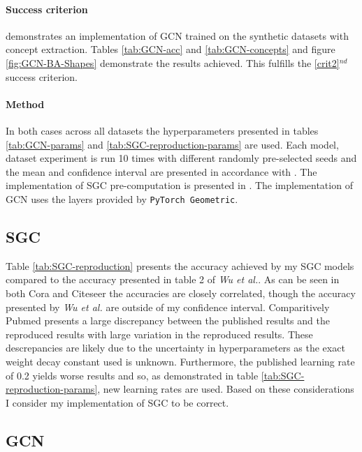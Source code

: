 \paragraph{Success criterion}
 demonstrates an implementation of GCN trained on the synthetic datasets with concept extraction.
Tables \ref{tab:GCN-acc} and \ref{tab:GCN-concepts} and figure \ref{fig:GCN-BA-Shapes} demonstrate the results achieved.
This fulfills the \ref{crit2}$^{nd}$ success criterion.

\paragraph{Method}
In both cases across all datasets the hyperparameters presented in tables \ref{tab:GCN-params} and \ref{tab:SGC-reproduction-params} are used.
Each model, dataset experiment is run 10 times with different randomly pre-selected seeds and the mean and confidence interval are presented in accordance with .
The implementation of SGC pre-computation is presented in .
The implementation of GCN uses the layers provided by \texttt{PyTorch Geometric}\cite{Fey/Lenssen/2019}.

\subsection{SGC}


Table \ref{tab:SGC-reproduction} presents the accuracy achieved by my SGC models compared to the accuracy presented in table 2 of \textit{Wu et al.}\cite{wu2019simplifying}.
As can be seen in both Cora and Citeseer the accuracies are closely correlated, though the accuracy presented by \textit{Wu et al.} are outside of my confidence interval.
Comparitively Pubmed presents a large discrepancy between the published results and the reproduced results with large variation in the reproduced results.
These descrepancies are likely due to the uncertainty in hyperparameters as the exact weight decay constant used is unknown.
Furthermore, the published learning rate of 0.2 yields worse results and so, as demonstrated in table \ref{tab:SGC-reproduction-params}, new learning rates are used.
Based on these considerations I consider my implementation of SGC to be correct.

\subsection{GCN}
\label{sec:GCN-reproduction}
